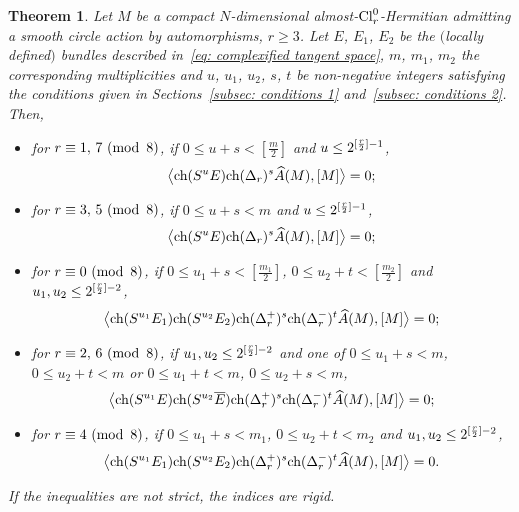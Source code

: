 \documentclass[10pt,a4paper]{amsart}
\newcommand{\A}{\mbox{$\widehat A$}}
\newcommand{\sym}{S}
\newcommand{\ch}{\mbox{\rm ch}}
\numberwithin{equation}{section}
\newtheorem{Theorem}{Theorem}[section]
\begin{document}
\begin{Theorem}\label{theo: vanishing 2} Let $M$ be a compact $N$-dimensional almost-${\rm Cl}_r^0$-Hermitian admitting a smooth circle action by automorphisms, $r\geq 3$. Let $E$, $E_1$, $E_2$ be the $($locally defined$)$ bundles described in~\eqref{eq: complexified tangent space}, $m$, $m_1$, $m_2$ the corresponding multiplicities and $u$, $u_1$, $u_2$, $s$, $t$ be non-negative integers satisfying the conditions given in Sections~{\rm \ref{subsec: conditions 1}} and~{\rm \ref{subsec: conditions 2}}. Then,
\begin{itemize}\itemsep=0pt
\item for $r\equiv 1,\, 7 \,\,({\rm mod\,\,\,} 8)$, if $0\leq u+s<[\frac{m}{2}]$ and $u\leq 2^{[{r\over 2}]-1}$,
 \begin{gather*}\big\langle \ch(\sym^u E)\ch(\Delta_r)^s\A(M),[M]\big\rangle =0;\end{gather*}

\item for $r\equiv 3,\, 5 \,\,({\rm mod\,\,\,} 8)$, if $0\leq u+s<m$ and $u\leq 2^{[{r\over 2}]-1}$,
 \begin{gather*}\big\langle \ch(\sym^u E)\ch(\Delta_r)^s\A(M),[M]\big\rangle =0;\end{gather*}

\item for $r\equiv 0 \,\,({\rm mod\,\,\,} 8)$, if $0\leq u_1+s<[\frac{m_1}{2}]$, $0\leq u_2+t<[\frac{m_2}{2}]$ and $u_1,u_2\leq 2^{[{r\over 2}]-2}$,
 \begin{gather*}\big\langle \ch(\sym^{u_1} E_1)\ch(\sym^{u_2} E_2)\ch(\Delta_r^+)^{s}\ch(\Delta_r^-)^{t}\A(M),[M]\big\rangle =0;\end{gather*}

\item for $r\equiv 2,\, 6 \,\,({\rm mod\,\,\,} 8)$, if $u_1,u_2\leq 2^{[{r\over 2}]-2}$ and one of $0\leq u_1+s<m$, $0 \leq u_2+t <m$ or $0\leq u_1+t<m$, $0 \leq u_2+s <m$,
 \begin{gather*}\big\langle \ch(\sym^{u_1} E)\ch(\sym^{u_2} \overline{E})\ch(\Delta_r^+)^{s}\ch(\Delta_r^-)^{t}\A(M),[M]\big\rangle =0;\end{gather*}

\item for $r\equiv 4 \,\,({\rm mod\,\,\,} 8)$, if $0\leq u_1+s<m_1$, $0\leq u_2+t<m_2$ and $u_1,u_2\leq 2^{[{r\over 2}]-2}$,
 \begin{gather*}\big\langle \ch(\sym^{u_1} E_1)\ch(\sym^{u_2} E_2)\ch(\Delta_r^+)^{s}\ch(\Delta_r^-)^{t}\A(M),[M]\big\rangle =0.\end{gather*}
\end{itemize}
If the inequalities are not strict, the indices are rigid.
\end{Theorem}
\end{document}
